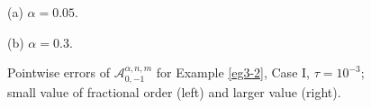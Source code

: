 \documentclass[10pt]{siamltex}
\begin{document}
\begin{figure}[!h]
\begin{center}
\begin{minipage}{0.49\textwidth}\centering
{}  \par{(a)   $\alpha = 0.05$.}
\end{minipage}
\begin{minipage}{0.49\textwidth}\centering
{}   \par{ {(b)} $\alpha = 0.3$.}
\end{minipage}
\end{center}
\caption{Pointwise errors of $\mathcal{A}_{0,-1}^{\alpha,n,m}$  for Example \ref{eg3-2},  Case I, $\tau=10^{-3}$;
small value of fractional order (left) and larger value (right).\label{fig2-2}}
\end{figure}
\end{document}
